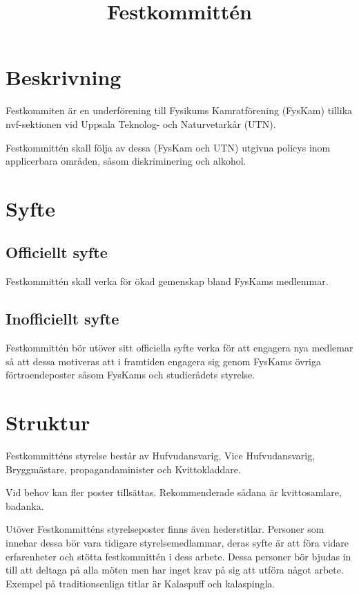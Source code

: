 \documentclass{dgovdoc}
\title{Festkommittén}
\begin{document}
\maketitle

\section{Beskrivning}

Festkommiten är en underförening till Fysikums Kamratförening (FysKam) tillika nvf-sektionen vid Uppsala Teknolog- och Naturvetarkår (UTN).

Festkommittén skall följa av dessa (FysKam och UTN) utgivna policys inom applicerbara områden, såsom diskriminering och alkohol.


\section{Syfte}

\subsection{Officiellt syfte}

Festkommittén skall verka för ökad gemenskap bland FysKams medlemmar.

\subsection{Inofficiellt syfte}

Festkommittén bör utöver sitt officiella syfte verka för att engagera nya medlemar så att dessa motiveras att i framtiden engagera sig genom FysKams övriga förtroendeposter såsom FysKams och studierådets styrelse.

\section{Struktur}

Festkommitténs styrelse består av Hufvudansvarig, Vice Hufvudansvarig, Bryggmästare, propagandaminister och Kvittokladdare.

Vid behov kan fler poster tillsättas. Rekommenderade sådana är kvittosamlare, badanka.

Utöver Festkommitténs styrelseposter finns även hederstitlar. Personer som innehar dessa bör vara tidigare styrelsemedlammar, deras syfte är att föra vidare erfarenheter och stötta festkommittén i dess arbete. Dessa personer bör bjudas in till att deltaga på alla möten men har inget krav på sig att utföra något arbete. Exempel på traditionsenliga titlar är Kalaspuff och kalaspingla.
\end{document}

